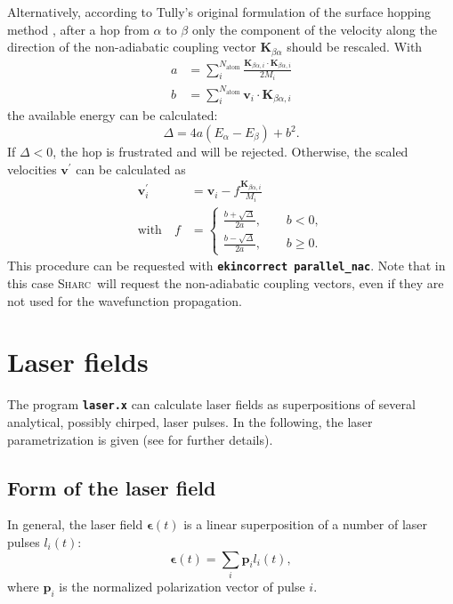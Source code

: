 \documentclass[a4paper,11pt,DIV=15,openany,twoside=false]{scrbook}
\newcommand{\sharc}{\textsc{Sharc}}
\newcommand{\ttt}[1]{\textbf{\texttt{#1}}}
\newcommand{\VEC}[1]{\ensuremath{\mathbf{#1}}}
\begin{document}
Alternatively, according to Tully's original formulation of the surface hopping method \cite{Tully1990JCP}, after a hop from $\alpha$ to $\beta$ only the component of the velocity along the direction of the non-adiabatic coupling vector $\VEC{K}_{\beta\alpha}$ should be rescaled. With
\begin{align}
  a&=\sum\limits_i^{N_\mathrm{atom}} \frac{\VEC{K}_{\beta\alpha, i}\cdot\VEC{K}_{\beta\alpha, i}}{2M_i}\\
  b&=\sum\limits_i^{N_\mathrm{atom}} \VEC{v}_{i}\cdot\VEC{K}_{\beta\alpha, i}
\end{align}
the available energy can be calculated:
\begin{equation}
  \Delta=
  4a
  \left(
    E_\alpha-E_\beta
  \right)+b^2.
\end{equation}
If $\Delta<0$, the hop is frustrated and will be rejected. Otherwise, the scaled velocities $\VEC{v}^\prime$ can be calculated as
\begin{align}
  \VEC{v}_i^\prime&=\VEC{v}_i-f\frac{\VEC{K}_{\beta\alpha, i}}{M_i}\\
  \mathrm{with}\quad f&=
  \begin{cases}
    \frac{b+\sqrt{\Delta}}{2a},\qquad b<0,\\
    \frac{b-\sqrt{\Delta}}{2a},\qquad b\geq 0.
  \end{cases}
\end{align}
This procedure can be requested with \ttt{ekincorrect parallel\_nac}. Note that in this case \sharc\ will request the non-adiabatic coupling vectors, even if they are not used for the wavefunction propagation.


\section{Laser fields}\label{met:laser_field}

The program \ttt{laser.x} can calculate laser fields as superpositions of several analytical, possibly chirped, laser pulses. In the following, the laser parametrization is given (see \cite{Marquetand2007} for further details).

\subsection{Form of the laser field}

In general, the laser field $\boldsymbol{\epsilon}(t)$ is a linear superposition of a number of laser pulses $l_i(t)$:
\begin{equation}
  \boldsymbol{\epsilon}(t)=\sum\limits_i \VEC{p}_il_i(t),
\end{equation}
where $\VEC{p}_i$ is the normalized polarization vector of pulse $i$.
\end{document}
